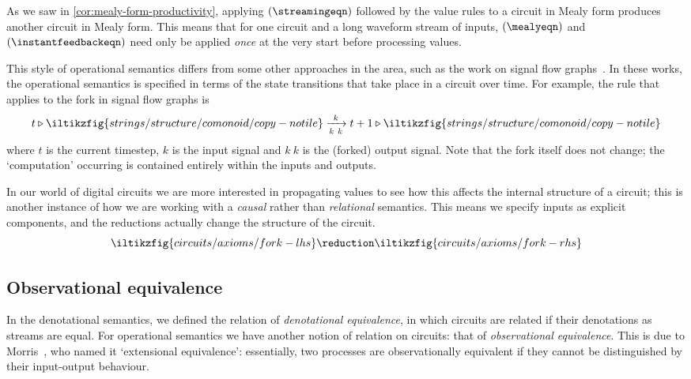 \documentclass{lmcs}
\begin{document}
\begin{rem}
    As we saw in \autoref{cor:mealy-form-productivity}, applying
    \((\streamingeqn)\) followed by the value rules to a circuit in Mealy form
    produces another circuit in Mealy form.
    This means that for one circuit and a long waveform stream of inputs,
    \((\mealyeqn)\) and \((\instantfeedbackeqn)\) need only be applied
    \emph{once} at the very start before processing values.
\end{rem}

\begin{rem}
    This style of operational semantics differs from some other approaches in
    the area, such as the work on signal flow graphs~\cite{bonchi2021survey}.
    In these works, the operational semantics is specified in terms of
    the state transitions that take place in a circuit over time.
    For example, the rule that applies to the fork in signal flow graphs is
    \[
        t \triangleright \iltikzfig{strings/structure/comonoid/copy-notile}
        \xrightarrow[k\ k]{k}
        t+1 \triangleright \iltikzfig{strings/structure/comonoid/copy-notile}
    \]
    where \(t\) is the current timestep, \(k\) is the input signal and
    \(k\ k\) is the (forked) output signal.
    Note that the fork itself does not change; the `computation' occurring is
    contained entirely within the inputs and outputs.

    In our world of digital circuits we are more interested in propagating
    values to see how this affects the internal structure of a circuit; this is
    another instance of how we are working with a \emph{causal} rather than
    \emph{relational} semantics.
    This means we specify inputs as explicit components, and the reductions
    actually change the structure of the circuit.
    \[
        \iltikzfig{circuits/axioms/fork-lhs}
        \reduction
        \iltikzfig{circuits/axioms/fork-rhs}
    \]
\end{rem}

\subsection{Observational equivalence}\label{sec:observational}

In the denotational semantics, we defined the relation of
\emph{denotational equivalence}, in which circuits are related if their
denotations as streams are equal.
For operational semantics we have another notion of relation on circuits: that
of \emph{observational equivalence}.
This is due to Morris~\cite{morris1969lambdacalculus}, who named it
`extensional equivalence': essentially, two processes are observationally
equivalent if they cannot be distinguished by their input-output behaviour.
\end{document}
